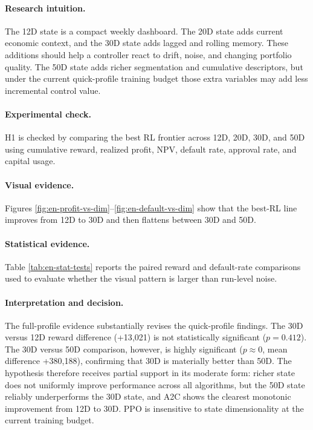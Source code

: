 \documentclass[12pt,a4paper]{article}
\begin{document}
\paragraph{Research intuition.}
The 12D state is a compact weekly dashboard. The 20D state adds current economic context, and the 30D state adds lagged and rolling memory. These additions should help a controller react to drift, noise, and changing portfolio quality. The 50D state adds richer segmentation and cumulative descriptors, but under the current quick-profile training budget those extra variables may add less incremental control value.

\paragraph{Experimental check.}
H1 is checked by comparing the best RL frontier across 12D, 20D, 30D, and 50D using cumulative reward, realized profit, NPV, default rate, approval rate, and capital usage.

\paragraph{Visual evidence.}
Figures \ref{fig:en-profit-vs-dim}--\ref{fig:en-default-vs-dim} show that the best-RL line improves from 12D to 30D and then flattens between 30D and 50D.

\paragraph{Statistical evidence.}
Table \ref{tab:en-stat-tests} reports the paired reward and default-rate comparisons used to evaluate whether the visual pattern is larger than run-level noise.

\paragraph{Interpretation and decision.}
The full-profile evidence substantially revises the quick-profile findings. The 30D versus 12D reward difference (+13{,}021) is not statistically significant ($p = 0.412$). The 30D versus 50D comparison, however, is highly significant ($p \approx 0$, mean difference +380{,}188), confirming that 30D is materially better than 50D. The hypothesis therefore receives partial support in its moderate form: richer state does not uniformly improve performance across all algorithms, but the 50D state reliably underperforms the 30D state, and A2C shows the clearest monotonic improvement from 12D to 30D. PPO is insensitive to state dimensionality at the current training budget.
\end{document}

